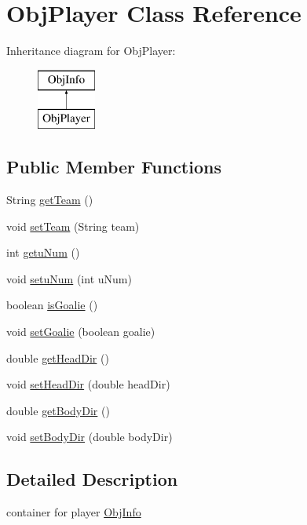 \hypertarget{classObjPlayer}{
\section{ObjPlayer Class Reference}
\label{classObjPlayer}
}
Inheritance diagram for ObjPlayer:\begin{figure}[H]
\begin{center}
\leavevmode
\includegraphics[height=2.000000cm]{classObjPlayer}
\end{center}
\end{figure}
\subsection*{Public Member Functions}
\begin{DoxyCompactItemize}
\item 
String \hyperlink{classObjPlayer_a52c8a9ee1da012abb60b7379e7763597}{getTeam} ()
\item 
void \hyperlink{classObjPlayer_ad1fa8b66e930eed448c800a6b80ee055}{setTeam} (String team)
\item 
int \hyperlink{classObjPlayer_a1d763181bd909af9fff3189cf014035f}{getuNum} ()
\item 
void \hyperlink{classObjPlayer_ae80af0d4c2cce1f90d0320ec2599c70e}{setuNum} (int uNum)
\item 
boolean \hyperlink{classObjPlayer_a74c9503f5232d9341a721b863c851fde}{isGoalie} ()
\item 
void \hyperlink{classObjPlayer_ad945cc86f383fed367bdda2b36a3e2ac}{setGoalie} (boolean goalie)
\item 
double \hyperlink{classObjPlayer_ad842a68637343da6ae9e5fbd361947a6}{getHeadDir} ()
\item 
void \hyperlink{classObjPlayer_a09a92949b4eb26e17ecb181f7d02001d}{setHeadDir} (double headDir)
\item 
double \hyperlink{classObjPlayer_a878c43dd285c24ab44fcb0a9b5aa3b62}{getBodyDir} ()
\item 
void \hyperlink{classObjPlayer_a002a52bb5e7b1c08e2585c335dc40023}{setBodyDir} (double bodyDir)
\end{DoxyCompactItemize}


\subsection{Detailed Description}
container for player \hyperlink{classObjInfo}{ObjInfo} 

